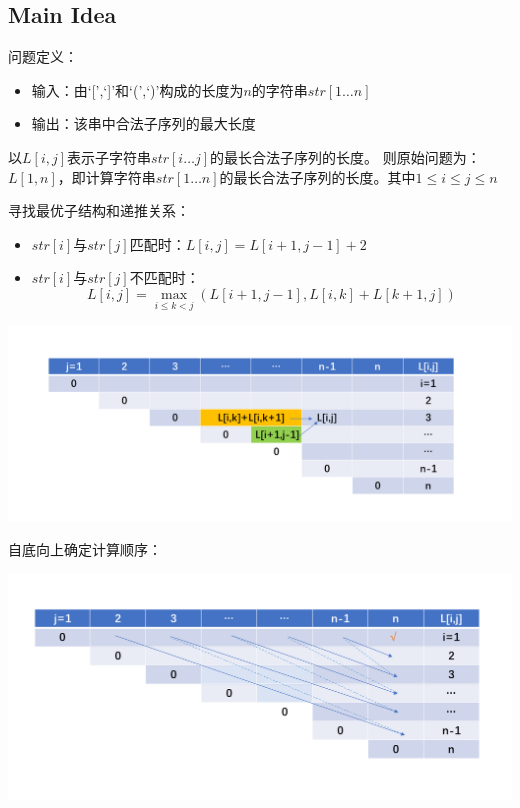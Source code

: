\documentclass{ctexart}
\begin{document}
\subsection{Main Idea}
问题定义：
\begin{itemize}
    \item 输入：由‘[’,‘]’和‘(’,‘)’构成的长度为$n$的字符串$str[1\ldots n]$
    \item 输出：该串中合法子序列的最大长度
\end{itemize}

以$L[i,j]$表示子字符串$str[i \ldots j]$的最长合法子序列的长度。
则原始问题为：$L[1,n]$，即计算字符串$str[1 \ldots n]$的最长合法子序列的长度。其中$1 \leq i \leq j \leq n$

寻找最优子结构和递推关系：
\begin{itemize}
    \item $str[i]$与$str[j]$匹配时：$L[i,j] = L[i+1,j-1]+2$
    \item $str[i]$与$str[j]$不匹配时：
    \begin{equation*}
        L[i,j]=\max_{i \leq k < j}(L[i+1,j-1],L[i,k]+L[k+1,j])
    \end{equation*}
\end{itemize}


\includegraphics[width=1.1\textwidth]{幻灯片3.PNG}

自底向上确定计算顺序：

\includegraphics[width=1.1\textwidth]{幻灯片5.PNG}
\end{document}
